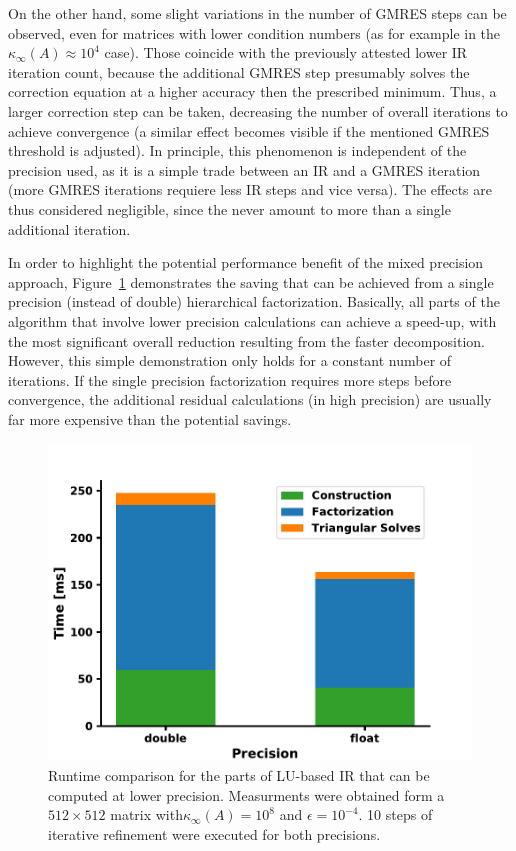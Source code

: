 On the other hand, some slight variations in the number of GMRES steps can be observed, even for matrices with lower condition numbers (as for example in the $\kappa_\infty(A) \approx 10^4$ case). Those coincide with the previously attested lower IR iteration count, because the additional GMRES step presumably solves the correction equation at a higher accuracy then the prescribed minimum. Thus, a larger correction step can be taken, decreasing the number of overall iterations to achieve convergence (a similar effect becomes visible if the mentioned GMRES threshold is adjusted). In principle, this phenomenon is independent of the precision used, as it is a simple trade between an IR and a GMRES iteration (more GMRES iterations requiere less IR steps and vice versa). The effects are thus considered negligible, since the never amount to more than a single additional iteration.

In order to highlight the potential performance benefit of the mixed precision approach, Figure~\hyperref[fig:lu_low]{\ref{fig:lu_low}} demonstrates the saving that can be achieved from a single precision (instead of double) hierarchical factorization. Basically, all parts of the algorithm that involve lower precision calculations can achieve a speed-up, with the most significant overall reduction resulting from the faster decomposition. However, this simple demonstration only holds for a constant number of iterations. If the single precision factorization requires more steps before convergence, the additional residual calculations (in high precision) are usually far more expensive than the potential savings.

\begin{figure}[h]
    \centering
    \includegraphics[width=0.6\linewidth]{chapters/5_experiments/figures/low.pdf}
    \caption[Mixed Precision Low-Rank IR - Performance]{Runtime comparison for the parts of LU-based IR that can be computed at lower precision. Measurments were obtained form a $512 \times 512$ matrix with$ \kappa_\infty(A)=10^8$ and $\epsilon = 10^{-4}$. 10 steps of iterative refinement were executed for both precisions.}
    \label{fig:lu_low}
\end{figure}

